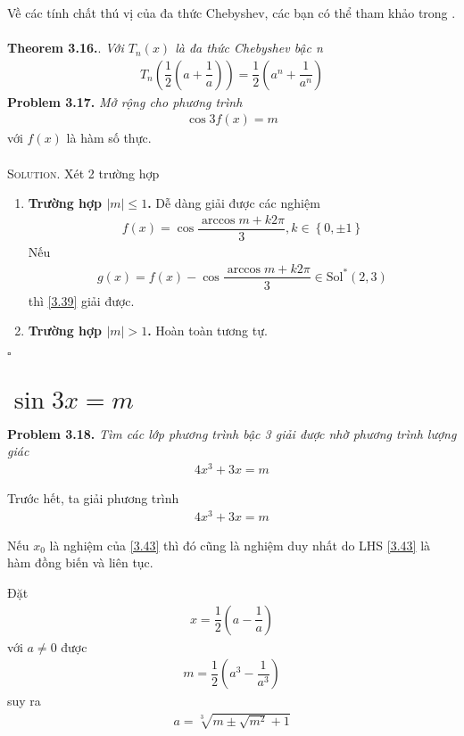 \documentclass[a4paper,oneside]{book}
\numberwithin{equation}{chapter}
\begin{document}
{Về các tính chất thú vị của đa thức Chebyshev, các bạn có thể tham khảo trong \cite{7}.\\
\\
\textbf{Theorem 3.16.}. \textit{Với ${T_n}\left( x \right)$ là đa thức Chebyshev bậc n}
\begin{align}
{T_n}\left( {\dfrac{1}{2}\left( {a + \dfrac{1}{a}} \right)} \right) = \dfrac{1}{2}\left( {{a^n} + \dfrac{1}{{{a^n}}}} \right)
\end{align}
\textbf{Problem 3.17.} \textit{Mở rộng cho phương trình}
\begin{align}
\label{3.39}
\cos 3f\left( x \right) = m
\end{align}
với $f\left( x\right)$ là hàm số thực.}\\
\\
\textsc{Solution.} Xét 2 trường hợp
\begin{enumerate}
\item \textbf{Trường hợp $\left| m \right| \le 1$.} Dễ dàng giải được các nghiệm 
\begin{align}
f\left( x \right) = \cos \dfrac{{\arccos m + k2\pi }}{3},k \in \left\{ {0, \pm 1} \right\}
\end{align}
Nếu 
\begin{align}
g\left( x \right) = f\left( x \right) - \cos \dfrac{{\arccos m + k2\pi }}{3} \in \mbox{Sol}^*\left( {2,3} \right)
\end{align}
thì \eqref{3.39} giải được.
\item \textbf{Trường hợp $\left| m \right| > 1$.} Hoàn toàn tương tự.
\end{enumerate}
\hfill $\square$
\section{$\sin 3x = m$}
\textbf{Problem 3.18.} \textit{Tìm các lớp phương trình bậc 3 giải được nhờ phương trình lượng giác}
\begin{align}
4{x^3} + 3x = m
\end{align}

Trước hết, ta giải phương trình
\begin{align}
\label{3.43}
4{x^3} + 3x = m
\end{align}

Nếu ${x_0}$ là nghiệm của \eqref{3.43} thì đó cũng là nghiệm duy nhất do LHS \eqref{3.43} là hàm đồng biến và liên tục.

Đặt 
\begin{align}
x = \dfrac{1}{2}\left( {a - \dfrac{1}{a}} \right)
\end{align}
với $a \ne 0$ được 
\begin{align}
m = \dfrac{1}{2}\left( {{a^3} - \dfrac{1}{{{a^3}}}} \right)
\end{align}
suy ra 
\begin{align}
a = \sqrt[3]{{m \pm \sqrt {{m^2}}  + 1}}
\end{align}
\end{document}
